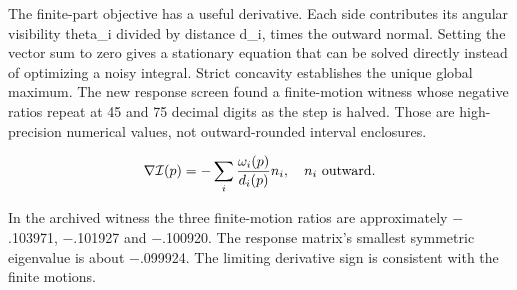 \documentclass[11pt,oneside,openany]{book}
\begin{document}
The finite-part objective has a useful derivative. Each side contributes its angular visibility theta\_i divided by distance d\_i, times the outward normal. Setting the vector sum to zero gives a stationary equation that can be solved directly instead of optimizing a noisy integral. Strict concavity establishes the unique global maximum. The new response screen found a finite-motion witness whose negative ratios repeat at 45 and 75 decimal digits as the step is halved. Those are high-precision numerical values, not outward-rounded interval enclosures.


\[\nabla\mathcal I(p)=-\sum_i\frac{\omega_i(p)}{d_i(p)}n_i,\quad n_i\ \hbox{outward}.\]


In the archived witness the three finite-motion ratios are approximately \ensuremath{-}.103971, \ensuremath{-}.101927 and \ensuremath{-}.100920. The response matrix's smallest symmetric eigenvalue is about \ensuremath{-}.099924. The limiting derivative sign is consistent with the finite motions.
\end{document}

